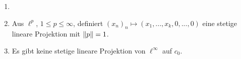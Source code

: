 \begin{beispiel*}
	\begin{enumerate}
		\item[]
		\item Aus $ \ell^p $, $ 1\leq p\leq\infty $, definiert $ (x_n)_n\mapsto (x_1,...,x_k,0,...,0) $ eine stetige lineare Projektion mit $ \left\|p\right\|=1 $.
		\item Es gibt keine stetige lineare Projektion von $ \ell^\infty $ auf $ c_0 $.  
	\end{enumerate}
\end{beispiel*}